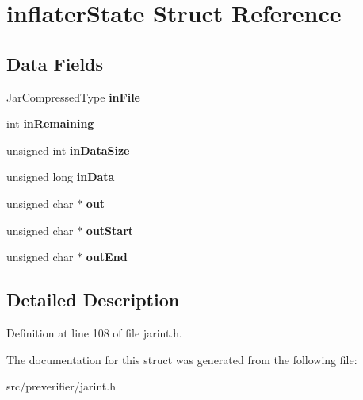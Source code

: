 \section{inflaterState Struct Reference}
\label{structinflater_state}
\subsection*{Data Fields}
\begin{DoxyCompactItemize}
\item 
JarCompressedType {\bfseries inFile}\label{structinflater_state_a8afd83c08efb9eb29080603f8a88d47d}

\item 
int {\bfseries inRemaining}\label{structinflater_state_ad687ce0b482066ba02446238ce735183}

\item 
unsigned int {\bfseries inDataSize}\label{structinflater_state_af0a59670ed371725e66bce1c98b29dab}

\item 
unsigned long {\bfseries inData}\label{structinflater_state_adccf0ada91432738d3334e361fe7f027}

\item 
unsigned char $\ast$ {\bfseries out}\label{structinflater_state_afcced38cb69c2d85fc74b67998c66523}

\item 
unsigned char $\ast$ {\bfseries outStart}\label{structinflater_state_ad2a743de2b8582b8aed4f179bd5d7dc1}

\item 
unsigned char $\ast$ {\bfseries outEnd}\label{structinflater_state_a63298fdcfa6d6e336389e7ca4c586096}

\end{DoxyCompactItemize}


\subsection{Detailed Description}


Definition at line 108 of file jarint.h.



The documentation for this struct was generated from the following file:\begin{DoxyCompactItemize}
\item 
src/preverifier/jarint.h\end{DoxyCompactItemize}
